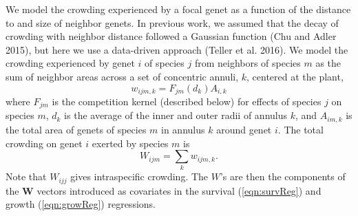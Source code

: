 \documentclass[11pt]{article}
\begin{document}
\begin{doublespacing}
We model the crowding experienced by a focal genet as a function of the distance to and size of neighbor genets. In previous work, we assumed that the decay of crowding with neighbor distance followed a Gaussian function (Chu and Adler 2015), but here we use a data-driven approach (Teller et al. 2016). We model the crowding experienced by genet $i$ of species $j$ from neighbors of species $m$ as the sum of neighbor areas across a set of concentric annuli, $k$, centered at the plant,
\begin{equation}
w_{ijm,k} = F_{jm}(d_{k})A_{i,k}     
\label{eqn:wik}
\end{equation}
where $F_{jm}$ is the competition kernel (described below) for effects of species $j$ on species $m$, 
$d_{k}$ is the average of the inner and outer radii of annulus $k$, 
and $A_{im,k}$ is the total area of genets of species $m$ in annulus $k$ around genet $i$. The total crowding on 
genet $i$ exerted by species $m$ is
\begin{equation}
W_{ijm}  =\sum_k {w_{ijm,k}} .
\end{equation} 
Note that $W_{ijj}$ gives intraspecific crowding. The $W$'s are then the components of the $\boldsymbol{W}$ vectors 
introduced as covariates in the survival (\ref{eqn:survReg}) and growth (\ref{eqn:growReg}) regressions.


\end{doublespacing}
\end{document}
